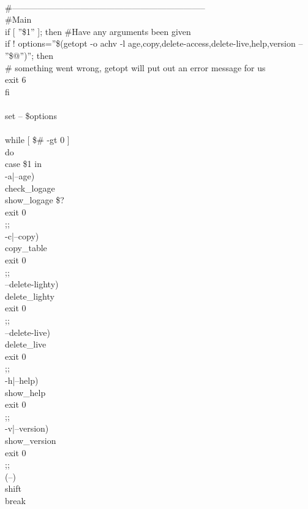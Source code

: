 \documentclass[10pt,a4paper]{article}
\begin{document}
{{{{{{{{{{{{{{{{{{{\\
\#--------------------------------------------------------------------\\
\#Main\\
if [ ''\$1'' ]; then                                \#Have any arguments been given\\
  if ! options=''\$(getopt -o achv -l age,copy,delete-access,delete-live,help,version -- ''\$@'')''; then\\
    \# something went wrong, getopt will put out an error message for us\\
    exit 6\\
  fi\\
\\
  set -- \$options\\
\\
  while [ \$\# -gt 0 ]\\
  do\\
    case \$1 in\\
      -a|--age)\\
        check\_logage\\
        show\_logage \$?\\
        exit 0\\
      ;;\\
      -c|--copy)\\
        copy\_table\\
        exit 0\\
      ;;\\
      --delete-lighty)\\
        delete\_lighty\\
        exit 0\\
      ;;\\
      --delete-live)\\
        delete\_live\\
        exit 0\\
      ;;\\
      -h|--help)\\
        show\_help\\
        exit 0\\
      ;;\\
      -v|--version) \\
        show\_version\\
        exit 0\\
      ;;\\
      (--) \\
        shift\\
        break\\
}}}}}}}}}}}}}}}}}}}
\end{document}
